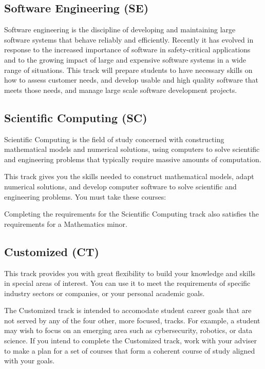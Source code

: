 \documentclass{book}
\begin{document}
\subsection{Software Engineering (SE)}
Software engineering is the discipline of developing and maintaining large software systems that behave reliably and efficiently. Recently it has evolved in response to the increased importance of software in safety-critical applications and to the growing impact of large and expensive software systems in a wide range of situations. This track will prepare students to have necessary skills on how to assess customer needs, and develop usable and high quality software that meets those needs, and manage large scale software development projects.

\subsection{Scientific Computing (SC)}

Scientific Computing is the field of study concerned with constructing mathematical models and numerical solutions, using computers to solve scientific and engineering problems that typically require massive amounts of computation.

This track gives you the skills needed to construct mathematical models, adapt numerical solutions, and develop computer software to solve scientific and engineering problems. You must take these courses:

Completing the requirements for the Scientific Computing track also satisfies the requirements for a Mathematics minor.

\subsection{Customized (CT)}

This track provides you with great flexibility to build your knowledge and skills in special areas of interest. You can use it to meet the requirements of specific industry sectors or companies, or your personal academic goals.

The Customized track is intended to accomodate student career goals that are not served by any of the four other, more focused, tracks. For example, a student may wish to focus on an emerging area such as cybersecurity, robotics, or data science. If you intend to complete the Customized track, work with your adviser to make a plan for a set of courses that form a coherent course of study aligned with your goals.
\end{document}
